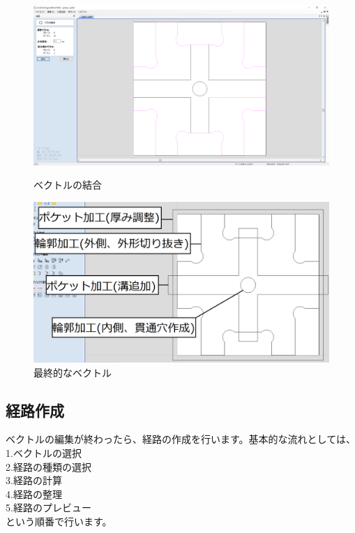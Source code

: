 \documentclass[b5paper, 9pt, twocolumn, titlepage,openany]{jsbook}%
\begin{document}
\begin{figure}[tbh]
  \begin{center}
    \begin{minipage}{0.9\columnwidth}
      \includegraphics[width=\columnwidth]{vector_connect.png}
    \end{minipage}
    \caption{ベクトルの結合    \label{connect}}
    \begin{minipage}{0.9\columnwidth}
      \includegraphics[width=\columnwidth]{final_vector_exp_trim.png}
    \end{minipage}
    \caption{最終的なベクトル    \label{final_vector}}
  \end{center}
\end{figure}


\clearpage
\subsection{経路作成}
ベクトルの編集が終わったら、経路の作成を行います。基本的な流れとしては、\\
  1.ベクトルの選択\\
  2.経路の種類の選択\\
  3.経路の計算\\
  4.経路の整理\\
  5.経路のプレビュー\\
  という順番で行います。\\
\end{document}
